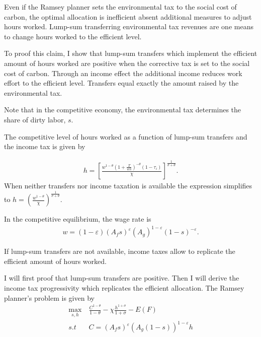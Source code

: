 \begin{prop}\label{prop:1}
Even if the Ramsey planner sets the environmental tax to the social cost of carbon, %
the optimal allocation is inefficient absent additional measures to adjust hours worked. Lump-sum transferring environmental tax revenues are one means to change hours worked to the efficient level. 
\end{prop}


To proof this claim, I show that lump-sum transfers which implement the efficient amount of hours worked are positive when the corrective tax is set to the social cost of carbon. Through an income effect the additional income reduces work effort to the efficient level. Transfers equal exactly the amount raised by the environmental tax. 

Note that in the competitive economy, the environmental tax determines the share of dirty labor, $s$. 

The competitive level of hours worked as a function of lump-sum transfers and the income tax is given by

\begin{align}
h = \left[\frac{w^{1-\theta}\left(1+\frac{T}{wh}\right)^{-\theta}(1-\tau_{\iota})}{\chi}\right]^{\frac{1}{\sigma+\theta}}.\label{eq:hopt}
\end{align}
When neither transfers nor income taxation is available the expression simplifies to $h=\left(\frac{w^{1-\theta}}{\chi}\right)^\frac{1}{\sigma +\theta}$.


In the competitive equilibrium, the wage rate is
\begin{align}
w= (1-\varepsilon)(A_fs)^\varepsilon (A_g)^{1-\varepsilon}(1-s)^{-\varepsilon}.
\end{align}


\begin{prop}
	If lump-sum transfers are not available, income taxes allow to replicate the efficient amount of hours worked.
\end{prop}

I will first proof that lump-sum transfers are positive. Then I will derive the income tax progressivity which replicates the efficient allocation. 
The Ramsey planner's problem is given by
\begin{align}
\underset{s, h}{\max}\ & \frac{C^{1-\theta}}{1-\theta}-\chi \frac{h^{1+\sigma}}{1+\sigma}-E(F)\\
s.t\ \ & C=\left(A_fs\right)^{\varepsilon}\left(A_g(1-s)\right)^{1-\varepsilon}h
\end{align}

